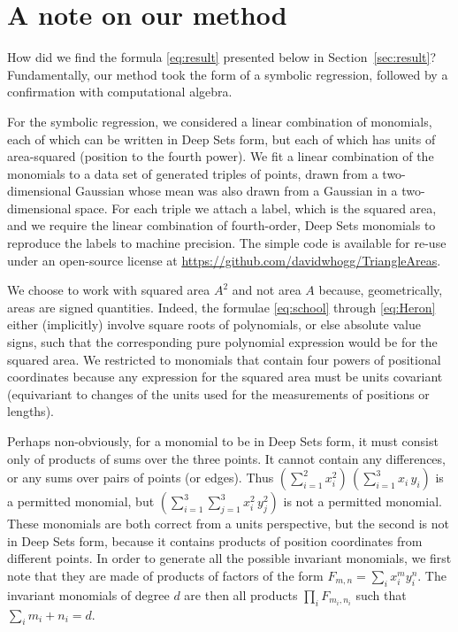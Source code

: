 \documentclass[12pt]{article}
\newcommand{\sectionname}{Section}
\newcommand{\secref}[1]{\sectionname~\ref{#1}}
\begin{document}
\section{A note on our method}\label{sec:method}
How did we find the formula \eqref{eq:result} presented below in \secref{sec:result}?
Fundamentally, our method took the form of a symbolic regression, followed by a confirmation with computational algebra.

For the symbolic regression, we considered a linear combination of monomials, each of which can be written in Deep Sets form, but each of which has units of area-squared (position to the fourth power).
We fit a linear combination of the monomials to a data set of generated triples of points, drawn from a two-dimensional Gaussian whose mean was also drawn from a Gaussian in a two-dimensional space.
For each triple we attach a label, which is the squared area, and we require the linear combination of fourth-order, Deep Sets monomials to reproduce the labels to machine precision.
The simple code is available for re-use under an open-source license at \url{https://github.com/davidwhogg/TriangleAreas}.

We choose to work with squared area $A^2$ and not area $A$ because, geometrically, areas are signed quantities.
Indeed, the formulae \eqref{eq:school} through \eqref{eq:Heron} either (implicitly) involve square roots of polynomials, or else absolute value signs, such that the corresponding pure polynomial expression would be for the squared area.
We restricted to monomials that contain four powers of positional coordinates because any expression for the squared area must be units covariant (equivariant to changes of the units used for the measurements of positions or lengths).

Perhaps non-obviously, for a monomial to be in Deep Sets form, it must consist only of products of sums over the three points.
It cannot contain any differences, or any sums over pairs of points (or edges).
Thus $(\sum_{i=1}^2 x_i^2)\,(\sum_{i=1}^3 x_i\,y_i)$ is a permitted monomial, but $(\sum_{i=1}^3\sum_{j=1}^3 x_i^2\,y_j^2)$ is not a permitted monomial.
These monomials are both correct from a units perspective, but the second is not in Deep Sets form, because it contains products of position coordinates from different points. 
In order to generate all the possible invariant monomials, we first note that they are made of products of factors of the form $F_{m,n} = \sum_i x_i^m y_i^n$.
The invariant monomials of degree $d$ are then all products $\prod_i F_{m_i, n_i}$ such that $\sum_i m_i + n_i = d$.
\end{document}
